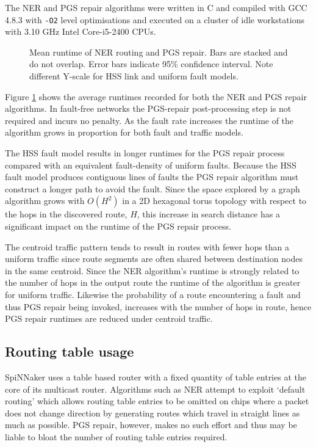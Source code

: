 			The NER and PGS repair algorithms were written in C and compiled with GCC
			4.8.3 with \verb|-O2| level optimisations and executed on a cluster of
			idle workstations with 3.10 GHz Intel Core-i5-2400 CPUs.
			
			\begin{figure}
				\center
				
				\caption{Mean runtime of NER routing and PGS repair. Bars are stacked
				and do not overlap. Error bars indicate 95\% confidence interval. Note
				different Y-scale for HSS link and uniform fault models.}
				\label{fig:routing-runtimes}
			\end{figure}
			
			Figure \ref{fig:routing-runtimes} shows the average runtimes recorded for
			both the NER and PGS repair algorithms. In fault-free networks the
			PGS-repair post-processing step is not required and incurs no penalty. As
			the fault rate increases the runtime of the algorithm grows in proportion
			for both fault and traffic models.
			
			The HSS fault model results in longer runtimes for the PGS repair process
			compared with an equivalent fault-density of uniform faults.  Because the
			HSS fault model produces contiguous lines of faults the PGS repair
			algorithm must construct a longer path to avoid the fault.  Since the
			space explored by a graph algorithm grows with $O(H^2)$ in a 2D hexagonal
			torus topology with respect to the hops in the discovered route, $H$,
			this increase in search distance has a significant impact on the runtime
			of the PGS repair process.
			
			The centroid traffic pattern tends to result in routes with fewer hops
			than a uniform traffic since route segments are often shared between
			destination nodes in the same centroid.  Since the NER algorithm's
			runtime is strongly related to the number of hops in the output route the
			runtime of the algorithm is greater for uniform traffic.  Likewise the
			probability of a route encountering a fault and thus PGS repair being
			invoked, increases with the number of hops in route, hence PGS repair
			runtimes are reduced under centroid traffic.
		
		\subsection{Routing table usage}
			
			SpiNNaker uses a table based router with a fixed quantity of table
			entries at the core of its multicast router. Algorithms such as NER
			attempt to exploit `default routing' which allows routing table entries
			to be omitted on chips where a packet does not change direction by
			generating routes which travel in straight lines as much as possible.
			PGS repair, however, makes no such effort and thus may be liable to bloat
			the number of routing table entries required.
			
